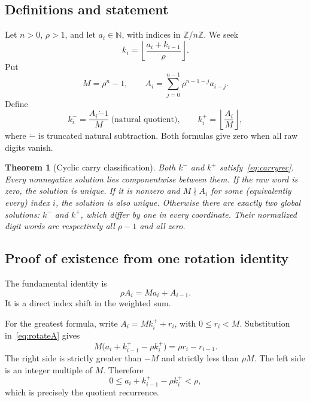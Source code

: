 \documentclass[11pt]{article}
\newtheorem{theorem}{Theorem}[section]
\theoremstyle{remark}\newtheorem{remark}[theorem]{Remark}
\newcommand{\N}{\mathbb N}\newcommand{\Z}{\mathbb Z}
\begin{document}
\subsection{Definitions and statement}

Let \(n>0\), \(\rho>1\), and let \(a_i\in\N\), with indices in \(\Z/n\Z\). We seek
\begin{equation}
 k_i=\left\lfloor\frac{a_i+k_{i-1}}\rho\right\rfloor.
 \label{eq:carryrec}
\end{equation}
Put
\[
 M=\rho^n-1,
 \qquad A_i=\sum_{j=0}^{n-1}\rho^{n-1-j}a_{i-j}.
\]
Define
\begin{equation}
 k_i^- = \frac{A_i\mathbin{\dot-}1}{M}\ \text{(natural quotient)},
 \qquad k_i^+ = \left\lfloor\frac{A_i}{M}\right\rfloor,
 \label{eq:carryformula}
\end{equation}
where \(\dot-\) is truncated natural subtraction. Both formulas give zero when all raw digits vanish.

\begin{theorem}[Cyclic carry classification]
Both \(k^-\) and \(k^+\) satisfy~\eqref{eq:carryrec}. Every nonnegative solution lies componentwise between them. If the raw word is zero, the solution is unique. If it is nonzero and \(M\nmid A_i\) for some (equivalently every) index \(i\), the solution is also unique. Otherwise there are exactly two global solutions: \(k^-\) and \(k^+\), which differ by one in every coordinate. Their normalized digit words are respectively all \(\rho-1\) and all zero.
\end{theorem}

\subsection{Proof of existence from one rotation identity}

The fundamental identity is
\begin{equation}
 \rho A_i=M a_i+A_{i-1}.
 \label{eq:rotateA}
\end{equation}
It is a direct index shift in the weighted sum.

For the greatest formula, write \(A_i=M k_i^++r_i\), with \(0\le r_i<M\). Substitution in~\eqref{eq:rotateA} gives
\[
 M\bigl(a_i+k_{i-1}^+-\rho k_i^+\bigr)=\rho r_i-r_{i-1}.
\]
The right side is strictly greater than \(-M\) and strictly less than \(\rho M\). The left side is an integer multiple of \(M\). Therefore
\[
 0\le a_i+k_{i-1}^+-\rho k_i^+<\rho,
\]
which is precisely the quotient recurrence.
\end{document}
